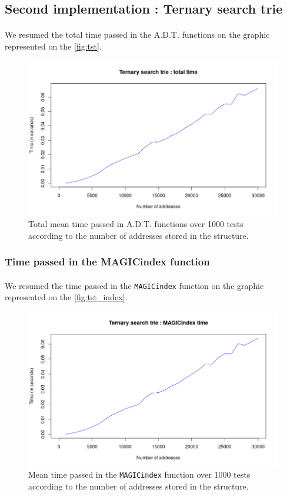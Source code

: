 \documentclass[a4paper, 11pt, oneside]{article}
\begin{document}
\subsection{Second implementation : Ternary search trie}
\paragraph{}We resumed the total time passed in the A.D.T. functions on the graphic represented on the \autoref{fig:tst}. 
\begin{figure}[H]
  \centering
  \includegraphics[scale=0.6]{plots/tst_total.png} 
  \caption{Total mean time passed in A.D.T. functions over 1000 tests according to the number of addresses stored in the structure.}\label{fig:tst}
\end{figure}
\subsubsection{Time passed in the MAGICindex function}
\paragraph{}We resumed the time passed in the \texttt{MAGICindex} function on the graphic represented on the \autoref{fig:tst_index}. 
\begin{figure}[H]
  \centering
  \includegraphics[scale=0.6]{plots/tst_index.png} 
  \caption{Mean time passed in the \texttt{MAGICindex} function over 1000 tests according to the number of addresses stored in the structure.}\label{fig:tst_index}
\end{figure}
\end{document}
